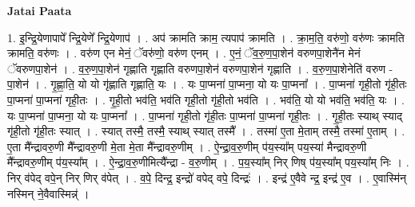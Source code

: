 \documentclass[17pt]{extarticle}
\begin{document}
\textbf{Jatai Paata} \newline

1. इ॒न्द्रि॒येणापापे᳚ न्द्रि॒येणे᳚ न्द्रि॒येणाप॑ । . अप॑ क्रामति क्राम॒ त्यपाप॑ क्रामति । . क्रा॒म॒ति॒ वरु॑णो॒ वरु॑णः क्रामति क्रामति॒ वरु॑णः । . वरु॑ण एन मेनं॒ ॅवरु॑णो॒ वरु॑ण एनम् । . ए॒नं॒ ॅव॒रु॒ण॒पा॒शेन॑ वरुणपा॒शेनै॑न मेनं ॅवरुणपा॒शेन॑ । . व॒रु॒ण॒पा॒शेन॑ गृह्णाति गृह्णाति वरुणपा॒शेन॑ वरुणपा॒शेन॑ गृह्णाति । . व॒रु॒ण॒पा॒शेनेति॑ वरुण - पा॒शेन॑ । . गृ॒ह्णा॒ति॒ यो यो गृ॑ह्णाति गृह्णाति॒ यः । . यः पा॒प्मना॑ पा॒प्मना॒ यो यः पा॒प्मना᳚ । . पा॒प्मना॑ गृही॒तो गृ॑ही॒तः पा॒प्मना॑ पा॒प्मना॑ गृही॒तः । . गृ॒ही॒तो भव॑ति॒ भव॑ति गृही॒तो गृ॑ही॒तो भव॑ति । . भव॑ति॒ यो यो भव॑ति॒ भव॑ति॒ यः । . यः पा॒प्मना॑ पा॒प्मना॒ यो यः पा॒प्मना᳚ । . पा॒प्मना॑ गृही॒तो गृ॑ही॒तः पा॒प्मना॑ पा॒प्मना॑ गृही॒तः । . गृ॒ही॒तः स्याथ् स्याद् गृ॑ही॒तो गृ॑ही॒तः स्यात् । . स्यात् तस्मै॒ तस्मै॒ स्याथ् स्यात् तस्मै᳚ । . तस्मा॑ ए॒ता मे॒ताम् तस्मै॒ तस्मा॑ ए॒ताम् । . ए॒ता मै᳚न्द्रावरु॒णी मै᳚न्द्रावरु॒णी मे॒ता मे॒ता मै᳚न्द्रावरु॒णीम् । . ऐ॒न्द्रा॒व॒रु॒णीम् प॑य॒स्या᳚म् पय॒स्या॑ मैन्द्रावरु॒णी मै᳚न्द्रावरु॒णीम् प॑य॒स्या᳚म् । . ऐ॒न्द्रा॒व॒रु॒णीमित्यै᳚न्द्रा - व॒रु॒णीम् । . प॒य॒स्या᳚म् निर् णिष् प॑य॒स्या᳚म् पय॒स्या᳚म् निः । . निर् व॑पेद् वपे॒न् निर् णिर् व॑पेत् । . व॒पे॒ दिन्द्र॒ इन्द्रो॑ वपेद् वपे॒ दिन्द्रः॑ । . इन्द्र॑ ए॒वैवे न्द्र॒ इन्द्र॑ ए॒व । . ए॒वास्मि॑न् नस्मिन् ने॒वैवास्मिन्न्॑ । \newline
\end{document}
